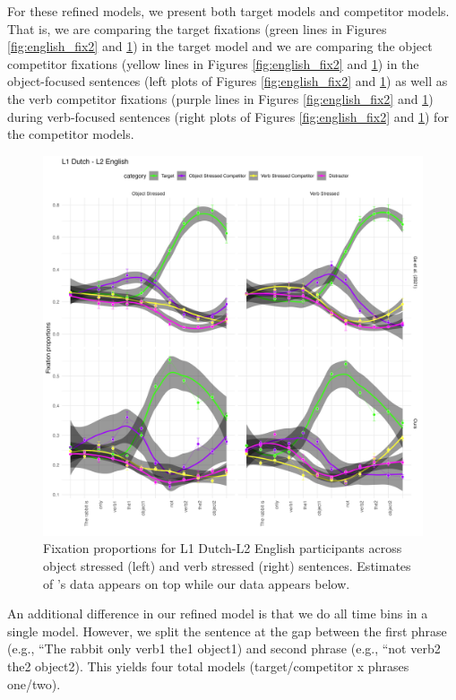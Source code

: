 For these refined models, we present both target models and competitor models. That is, we are comparing the target fixations (green lines in Figures \ref{fig:english_fix2} and \ref{fig:dutch_fix2}) in the target model and we are comparing the object competitor fixations (yellow lines in Figures \ref{fig:english_fix2} and \ref{fig:dutch_fix2}) in the object-focused sentences (left plots of Figures \ref{fig:english_fix2} and \ref{fig:dutch_fix2}) as well as the verb competitor fixations (purple lines in Figures \ref{fig:english_fix2} and \ref{fig:dutch_fix2}) during verb-focused sentences (right plots of Figures \ref{fig:english_fix2} and \ref{fig:dutch_fix2}) for the competitor models. 

\begin{figure}[H]  %
    \centering
    \includegraphics[width=\textwidth,height=\textheight,keepaspectratio]{viz/dutch_fix2.png}
    \caption{Fixation proportions for L1 Dutch-L2 English participants across object stressed (left) and verb stressed (right) sentences. Estimates of \cite{Ge2021}'s data appears on top while our data appears below.}
    \label{fig:dutch_fix2}
\end{figure}

An additional difference in our refined model is that we do all time bins in a single model. However, we split the sentence at the gap between the first phrase (e.g., ``The rabbit only verb1 the1 object1) and second phrase (e.g., ``not verb2 the2 object2). This yields four total models (target/competitor x phrases one/two). 


